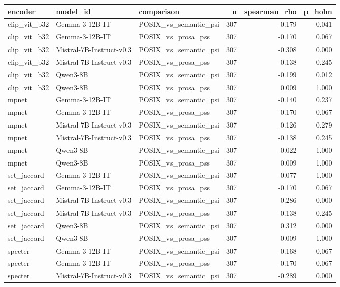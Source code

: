 \begin{tabular}{lllrrr}
\toprule
encoder & model\_id & comparison & n & spearman\_rho & p\_holm \\
\midrule
clip\_vit\_b32 & Gemma-3-12B-IT & POSIX\_vs\_semantic\_psi & 307 & -0.179 & 0.041 \\
clip\_vit\_b32 & Gemma-3-12B-IT & POSIX\_vs\_prosa\_pss & 307 & -0.170 & 0.067 \\
clip\_vit\_b32 & Mistral-7B-Instruct-v0.3 & POSIX\_vs\_semantic\_psi & 307 & -0.308 & 0.000 \\
clip\_vit\_b32 & Mistral-7B-Instruct-v0.3 & POSIX\_vs\_prosa\_pss & 307 & -0.138 & 0.245 \\
clip\_vit\_b32 & Qwen3-8B & POSIX\_vs\_semantic\_psi & 307 & -0.199 & 0.012 \\
clip\_vit\_b32 & Qwen3-8B & POSIX\_vs\_prosa\_pss & 307 & 0.009 & 1.000 \\
mpnet & Gemma-3-12B-IT & POSIX\_vs\_semantic\_psi & 307 & -0.140 & 0.237 \\
mpnet & Gemma-3-12B-IT & POSIX\_vs\_prosa\_pss & 307 & -0.170 & 0.067 \\
mpnet & Mistral-7B-Instruct-v0.3 & POSIX\_vs\_semantic\_psi & 307 & -0.126 & 0.279 \\
mpnet & Mistral-7B-Instruct-v0.3 & POSIX\_vs\_prosa\_pss & 307 & -0.138 & 0.245 \\
mpnet & Qwen3-8B & POSIX\_vs\_semantic\_psi & 307 & -0.022 & 1.000 \\
mpnet & Qwen3-8B & POSIX\_vs\_prosa\_pss & 307 & 0.009 & 1.000 \\
set\_jaccard & Gemma-3-12B-IT & POSIX\_vs\_semantic\_psi & 307 & -0.077 & 1.000 \\
set\_jaccard & Gemma-3-12B-IT & POSIX\_vs\_prosa\_pss & 307 & -0.170 & 0.067 \\
set\_jaccard & Mistral-7B-Instruct-v0.3 & POSIX\_vs\_semantic\_psi & 307 & 0.286 & 0.000 \\
set\_jaccard & Mistral-7B-Instruct-v0.3 & POSIX\_vs\_prosa\_pss & 307 & -0.138 & 0.245 \\
set\_jaccard & Qwen3-8B & POSIX\_vs\_semantic\_psi & 307 & 0.312 & 0.000 \\
set\_jaccard & Qwen3-8B & POSIX\_vs\_prosa\_pss & 307 & 0.009 & 1.000 \\
specter & Gemma-3-12B-IT & POSIX\_vs\_semantic\_psi & 307 & -0.168 & 0.067 \\
specter & Gemma-3-12B-IT & POSIX\_vs\_prosa\_pss & 307 & -0.170 & 0.067 \\
specter & Mistral-7B-Instruct-v0.3 & POSIX\_vs\_semantic\_psi & 307 & -0.289 & 0.000 \\

\end{tabular}
